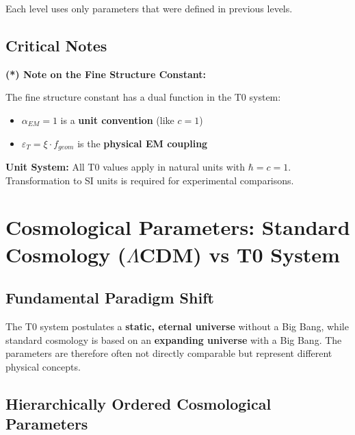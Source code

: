 \documentclass[12pt,a4paper]{article}
\begin{document}
Each level uses only parameters that were defined in previous levels.

\subsection{Critical Notes}
\label{subsec:critical_notes}

\textbf{(*) Note on the Fine Structure Constant:}

The fine structure constant has a dual function in the T0 system:
\begin{itemize}
	\item $\alpha_{EM} = 1$ is a \textbf{unit convention} (like $c = 1$)
	\item $\varepsilon_T = \xi \cdot f_{geom}$ is the \textbf{physical EM coupling}
\end{itemize}

\textbf{Unit System:}
All T0 values apply in natural units with $\hbar = c = 1$. Transformation to SI units is required for experimental comparisons.
\section{Cosmological Parameters: Standard Cosmology ($\Lambda$CDM) vs T0 System}
\label{sec:cosmic_t0_mapping}

\subsection{Fundamental Paradigm Shift}
\label{subsec:paradigm_shift}

\begin{tcolorbox}[colback=red!5!white,colframe=red!75!black,title=Warning: Fundamental Differences]
	The T0 system postulates a \textbf{static, eternal universe} without a Big Bang, while standard cosmology is based on an \textbf{expanding universe} with a Big Bang. The parameters are therefore often not directly comparable but represent different physical concepts.
\end{tcolorbox}

\subsection{Hierarchically Ordered Cosmological Parameters}
\label{subsec:cosmic_hierarchical_mapping}
\end{document}
